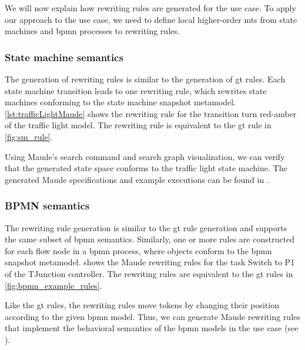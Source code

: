 \documentclass{jot}
\begin{document}
We will now explain how rewriting rules are generated for the use case.
To apply our approach to the use case, we need to define local higher-order \gls*{mt}s from state machines and \gls*{bpmn} processes to rewriting rules.


\subsubsection{State machine semantics}
The generation of rewriting rules is similar to the generation of \gls*{gt} rules.
Each state machine transition leads to one rewriting rule, which rewrites state machines conforming to the state machine snapshot metamodel.
\autoref{lst:trafficLightMaude} shows the rewriting rule for the transition \textsf{turn red-amber} of the traffic light model.
The rewriting rule is equivalent to the \gls*{gt} rule in \cref{fig:sm_rule}.



Using Maude's search command and search graph visualization, we can verify that the generated state space conforms to the traffic light state machine.
The generated Maude specifications and example executions can be found in \cite{krauterArtifactsBehavioralConsistency2022}.

\subsubsection{BPMN semantics}
The rewriting rule generation is similar to the \gls*{gt} rule generation and supports the same subset of \gls*{bpmn} semantics.
Similarly, one or more rules are constructed for each flow node in a \gls*{bpmn} process, where objects conform to the \gls*{bpmn} snapshot metamodel.
 shows the Maude rewriting rules for the task \textsf{Switch to P1} of the TJunction controller.
The rewriting rules are equivalent to the \gls*{gt} rules in \cref{fig:bpmn_example_rules}.



Like the \gls*{gt} rules, the rewriting rules move tokens by changing their position according to the given \gls*{bpmn} model.
Thus, we can generate Maude rewriting rules that implement the behavioral semantics of the \gls*{bpmn} models in the use case (see \cite{krauterArtifactsBehavioralConsistency2022}).
\end{document}
